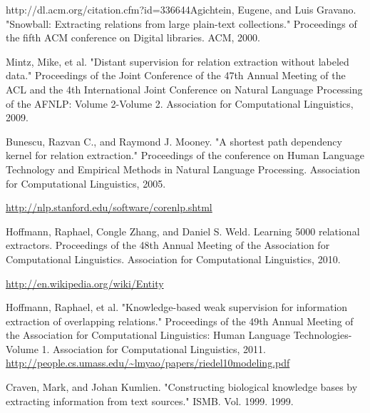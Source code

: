 \begin{thebibliography}{9}
 \label{snowball}
http://dl.acm.org/citation.cfm?id=336644Agichtein, Eugene, and Luis Gravano. "Snowball: Extracting relations from large plain-text collections." Proceedings of the fifth ACM conference on Digital libraries. ACM, 2000.
 
 \label{mintz}
Mintz, Mike, et al. "Distant supervision for relation extraction without labeled data." Proceedings of the Joint Conference of the 47th Annual Meeting of the ACL and the 4th International Joint Conference on Natural Language Processing of the AFNLP: Volume 2-Volume 2. Association for Computational Linguistics, 2009.
 
 \label{shortestpathdep}
Bunescu, Razvan C., and Raymond J. Mooney. "A shortest path dependency kernel for relation extraction." Proceedings of the conference on Human Language Technology and Empirical Methods in Natural Language Processing. Association for Computational Linguistics, 2005.
 
 \label{corenlp}
\url{http://nlp.stanford.edu/software/corenlp.shtml}
 
 \label{rel}
Hoffmann, Raphael, Congle Zhang, and Daniel S. Weld. Learning 5000 relational extractors. Proceedings of the 48th Annual Meeting of the Association for Computational Linguistics. Association for Computational Linguistics, 2010.

 \label{wikientity}
\url{http://en.wikipedia.org/wiki/Entity}

 \label{multir}
Hoffmann, Raphael, et al. "Knowledge-based weak supervision for information extraction of overlapping relations." Proceedings of the 49th Annual Meeting of the Association for Computational Linguistics: Human Language Technologies-Volume 1. Association for Computational Linguistics, 2011.
 \label{riedel}
\url{http://people.cs.umass.edu/~lmyao/papers/riedel10modeling.pdf}
 \label{craven}

Craven, Mark, and Johan Kumlien. "Constructing biological knowledge bases by extracting information from text sources." ISMB. Vol. 1999. 1999.

\end{thebibliography}
